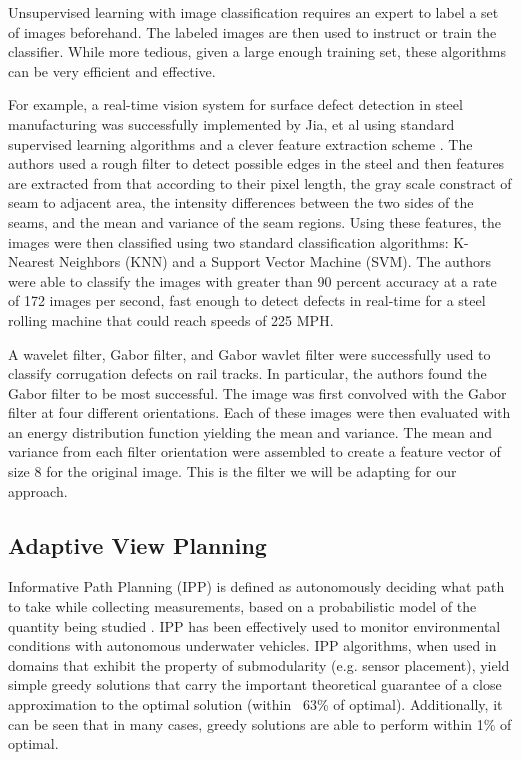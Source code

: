 \documentclass[letterpaper, 10 pt, conference]{ieeeconf}  %
\begin{document}
Unsupervised learning with image classification requires an expert to label a set of images beforehand. The labeled images are then used to instruct or train the classifier. While more tedious, given a large enough training set, these algorithms can be very efficient and effective.

For example, a real-time vision system for surface defect detection in steel manufacturing was successfully implemented by Jia, et al using standard supervised learning algorithms and a clever feature extraction scheme \cite{steelDefect}. The authors used a rough filter to detect possible edges in the steel and then features are extracted from that according to their pixel length, the gray scale constract of seam to adjacent area, the intensity differences between the two sides of the seams, and the mean and variance of the seam regions. Using these features, the images were then classified using two standard classification algorithms: K-Nearest Neighbors (KNN) and a Support Vector Machine (SVM). The authors were able to classify the images with greater than 90 percent accuracy at a rate of 172 images per second, fast enough to detect defects in real-time for a steel rolling machine that could reach speeds of 225 MPH.

A wavelet filter, Gabor filter, and Gabor wavlet filter were successfully used to classify corrugation defects on rail tracks\cite{railDefect}. In particular, the authors found the Gabor filter to be most successful. The image was first convolved with the Gabor filter at four different orientations. Each of these images were then evaluated with an energy distribution function yielding the mean and variance.  The mean and variance from each filter orientation were assembled to create a feature vector of size 8 for the original image. This is the filter we will be adapting for our approach.

\subsection{Adaptive View Planning}

Informative Path Planning (IPP) is defined as autonomously deciding what path to take while collecting measurements, based on a probabilistic model of the quantity being studied \cite{BNBIPP}. IPP has been effectively used to monitor environmental conditions with autonomous underwater vehicles\cite{BNBIPP}\cite{underwaterIPP}. IPP algorithms, when used in domains that exhibit the property of submodularity (e.g. sensor placement), yield simple greedy solutions that carry the important theoretical guarantee of a close approximation to the optimal solution (within ~63\% of optimal). Additionally, it can be seen that in many cases, greedy solutions are able to perform within 1\% of optimal. 
\end{document}
